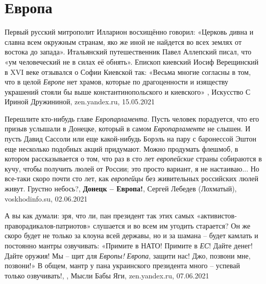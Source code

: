 
 
 
 
 
\chapter{Европа}

Первый русский митрополит Илларион восхищённо говорил: «Церковь дивна и славна
всем окружным странам, яко же иной не найдется во всех землях от востока до
запада».  Итальянский путешественник Павел Аллепский писал, что «ум
человеческий не в силах её обнять».  Епископ киевский Иосиф Верещинский в XVI
веке отзывался о Софии Киевской так: «Весьма многие согласны в том, что в целой
\emph{Европе} нет храмов, которые по драгоценности и изяществу украшений стояли бы
выше константинопольского и киевского»
, 
Искусство С Ириной Дружининой, zen.yandex.ru, 15.05.2021

Перешлите кто-нибудь главе \emph{Европарламента}. Пусть человек порадуется, что
его призыв услышали в Донецке, который в самом \emph{Европарламенте} не слышен.
И пусть Давид Сассоли или еще какой-нибудь Борэль на пару с баронессой Эштон
еще несколько подобных акций придумают.  Можно продумать флешмоб, в котором
рассказывается о том, что раз в сто лет \emph{европейские} страны собираются в
кучу, чтобы получить люлей от России; это просто вариант, я не настаиваю... Но
все-таки скоро почти сто лет, как \emph{европейцы} без живительных российских
люлей живут.  Грустно небось?, 
\textbf{Донецк – Европа!}, Сергей Лебедев (Лохматый), voskhodinfo.su, 02.06.2021

А вы как думали: зря, что ли, пан президент так этих самых
«активистов-праворадикалов-патриотов» слушается и во всем им угодить старается?
Он же скоро будет не только за клоуна всей державы, но и за шамана – будет
камлать и постоянно мантры озвучивать: «Примите в НАТО! Примите в \emph{ЕС}!
Дайте денег! Дайте оружия! Мы – щит для \emph{Европы!} \emph{Европа}, защити
нас! Джо, позвони мне, позвони!» В общем, мантр у пана украинского президента
много – успевай только озвучивать!,
, Мысли Бабы Яги, zen.yandex.ru, 07.06.2021

